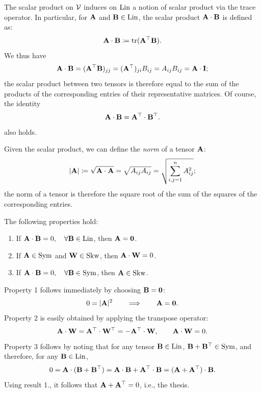 The scalar product on $\mathcal{V}$ induces on $\operatorname{Lin}$ a notion of scalar product via the trace operator. In particular, for $\mathbf{A}$ and $\mathbf{B}\in \operatorname{Lin}$, the scalar product $\mathbf{A} \cdot \mathbf{B}$ is defined as:
\begin{equation}
	\mathbf{A} \cdot \mathbf{B} \coloneqq \operatorname{tr}(\mathbf{A} ^\top \mathbf{B}).
\end{equation}
We thus have
\begin{equation}
	\mathbf{A} \cdot \mathbf{B} = (\mathbf{A} ^\top \mathbf{B})_{jj}=(\mathbf{A} ^\top)_{ji}B_{ij}=A_{ij}B_{ij}=\mathbf{A} \cdot \mathbf{I};
\end{equation}
the scalar product between two tensors is therefore equal to the sum of the products of the corresponding entries of their representative matrices. Of course, the identity
\begin{equation}
	\mathbf{A} \cdot \mathbf{B} =\mathbf{A} ^\top \cdot \mathbf{B} ^\top.
\end{equation}
also holds.

Given the scalar product, we can define the \textit{norm} of a tensor $\mathbf{A}$:
\begin{equation}
	|\mathbf{A}|\coloneqq \sqrt{\mathbf{A} \cdot \mathbf{A}}=\sqrt{A_{ij}A_{ij}}=\sqrt{\sum_{i,j=1}^n A_{ij}^2};
\end{equation}
the norm of a tensor is therefore the square root of the sum of the squares of the corresponding entries.

\vspace{.5cm}

\noindent The following properties hold:
\begin{enumerate}
	\item If $\mathbf{A} \cdot \mathbf{B}=0, \quad \forall \mathbf{B} \in \operatorname{Lin}$, then $\mathbf{A} =\mathbf{0}$.
	\item If $\mathbf{A} \in \operatorname{Sym}$ and $\mathbf{W} \in \operatorname{Skw}$, then $\mathbf{A} \cdot \mathbf{W} =0$.
	\item If $\mathbf{A} \cdot \mathbf{B}=0, \quad \forall \mathbf{B} \in \operatorname{Sym}$, then $\mathbf{A} \in \operatorname{Skw}$.
\end{enumerate}

Property 1 follows immediately by choosing $\mathbf{B} =\mathbf{0}$:
\begin{equation}
	0=|\mathbf{A}|^2 \qquad \Longrightarrow\qquad \mathbf{A} =\mathbf{0}.
\end{equation}
Property 2 is easily obtained by applying the transpose operator:
\begin{equation}
	\mathbf{A} \cdot \mathbf{W} =\mathbf{A}^\top \cdot \mathbf{W}^\top=-\mathbf{A}^\top \cdot \mathbf{W}, \qquad \mathbf{A} \cdot \mathbf{W}=0.
\end{equation}
Property 3 follows by noting that for any tensor $\mathbf{B} \in \operatorname{Lin}$, $\mathbf{B} + \mathbf{B} ^\top\in \operatorname{Sym}$, and therefore, for any $\mathbf{B} \in \operatorname{Lin}$,
\begin{equation}
	0=\mathbf{A} \cdot (\mathbf{B} +\mathbf{B} ^\top)=\mathbf{A} \cdot \mathbf{B} + \mathbf{A} ^\top \cdot \mathbf{B} =(\mathbf{A} + \mathbf{A} ^\top)\cdot \mathbf{B}.
\end{equation}
Using result 1., it follows that $\mathbf{A} + \mathbf{A} ^\top=0$, i.e., the thesis.

